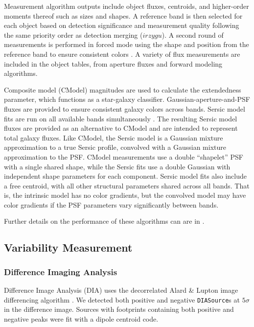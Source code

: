 Measurement \gls{algorithm} outputs include object fluxes, centroids, and higher-order moments thereof such as sizes and shapes.
A reference band is then selected for each object based on detection significance and measurement quality following the same priority order as detection merging ($irzygu$).
A second round of measurements is performed in forced mode using the shape and position from the reference band to ensure consistent colors \citep{2018PASJ...70S...5B}.
A variety of \gls{flux} measurements are included in the object tables, from aperture fluxes and forward modeling algorithms.

Composite model (CModel) magnitudes \citep{2004AJ....128..502A, 2018PASJ...70S...5B} are used to calculate the extendedness parameter, which functions as a star-galaxy classifier.
Gaussian-aperture-and-PSF \citep[GAaP][]{2008A&A...482.1053K, DMTN-190} fluxes are provided to ensure consistent galaxy colors across bands.
Sersic model \citep{1963BAAA....6...41S, 1968adga.book.....S} fits are run on all available bands simultaneously \cite[MultiProFit,][]{dmtn-312}.
The resulting Sersic model fluxes are provided as an alternative to CModel and are intended to represent total galaxy fluxes.
Like CModel, the Sersic model is a Gaussian mixture approximation to a true Sersic profile, convolved with a Gaussian mixture approximation to the \gls{PSF}.
CModel measurements use a double ``shapelet'' \citep{2003ARA&A..41..645R} PSF with a single shared shape, while the Sersic fits use a double Gaussian with independent shape parameters for each component.
Sersic model fits also include a free centroid, with all other structural parameters shared across all bands.
That is, the intrinsic model has no color gradients, but the convolved model may have color gradients if the \gls{PSF} parameters vary significantly between bands.

Further details on the performance of these algorithms can are in .

\subsection{Variability Measurement}

\subsubsection{Difference Imaging Analysis
\label{ssec:difim_analysis}}
Difference Image Analysis (DIA) uses the decorrelated Alard \& Lupton image differencing algorithm \citep{DMTN-021}.
We detected both positive and negative \texttt{DIASource}s at $5\sigma$ in the difference image.
Sources with footprints containing both positive and negative peaks were fit with a dipole centroid code.

